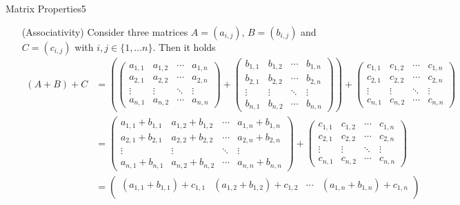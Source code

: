 \begin{questions}
\begin{question}{Matrix Properties}{5}
\begin{answer}
\begin{itemize}
		\item[(Associativity)]
		Consider three matrices $A = (a_{i, j})$, $B = (b_{i, j})$ and $C = (c_{i, j})$ with $i, j \in \{1, \dots n\}$. Then it holds
		\begin{align*}
\hspace{0cm}(A + B) + C &= (\begin{pmatrix}
a_{1, 1} & a_{1, 2} & \cdots & a_{1, n}\\
a_{2, 1} & a_{2, 2} & \cdots & a_{2, n}\\
\vdots & \vdots & \ddots & \vdots\\
a_{n, 1} & a_{n, 2} & \cdots & a_{n, n}
\end{pmatrix} + \begin{pmatrix}
b_{1, 1} & b_{1, 2} & \cdots & b_{1, n}\\
b_{2, 1} & b_{2, 2} & \cdots & b_{2, n}\\
\vdots & \vdots & \ddots & \vdots\\
b_{n, 1} & b_{n, 2} & \cdots & b_{n, n}
\end{pmatrix}) + \begin{pmatrix}
c_{1, 1} & c_{1, 2} & \cdots & c_{1, n}\\
c_{2, 1} & c_{2, 2} & \cdots & c_{2, n}\\
\vdots & \vdots & \ddots & \vdots\\
c_{n, 1} & c_{n, 2} & \cdots & c_{n, n}
\end{pmatrix}\\
&= \begin{pmatrix}
a_{1, 1} + b_{1, 1} & a_{1, 2} + b_{1, 2} & \cdots & a_{1, n} + b_{1, n}\\
a_{2, 1} + b_{2, 1} & a_{2, 2} + b_{2, 2} & \cdots & a_{2, n} + b_{2, n}\\
\vdots & \vdots & \ddots & \vdots\\
a_{n, 1} + b_{n, 1} & a_{n, 2} + b_{n, 2} & \cdots & a_{n, n} + b_{n, n}
\end{pmatrix} + \begin{pmatrix}
c_{1, 1} & c_{1, 2} & \cdots & c_{1, n}\\
c_{2, 1} & c_{2, 2} & \cdots & c_{2, n}\\
\vdots & \vdots & \ddots & \vdots\\
c_{n, 1} & c_{n, 2} & \cdots & c_{n, n}
\end{pmatrix}\\
&= \begin{pmatrix}
\hspace{0cm}(a_{1, 1} + b_{1, 1}) + c_{1, 1} & \hspace{0cm}(a_{1, 2} + b_{1, 2}) + c_{1, 2} & \cdots & \hspace{0cm}(a_{1, n} + b_{1, n}) + c_{1, n}\\

\end{pmatrix}
\end{align*}
\end{itemize}
\end{answer}
\end{question}
\end{questions}
